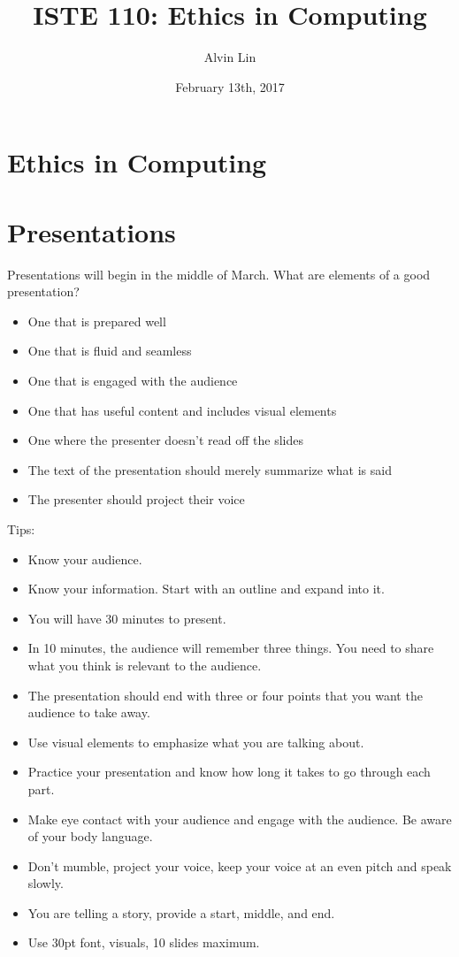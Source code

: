 \documentclass[letterpaper, 12pt]{article}
\title{ISTE 110: Ethics in Computing}
\author{Alvin Lin}
\date{February 13th, 2017}
\begin{document}
\maketitle

\section*{Ethics in Computing}

\section*{Presentations}
Presentations will begin in the middle of March.
What are elements of a good presentation?
\begin{itemize}
  \item One that is prepared well
  \item One that is fluid and seamless
  \item One that is engaged with the audience
  \item One that has useful content and includes visual elements
  \item One where the presenter doesn't read off the slides
  \item The text of the presentation should merely summarize what is said
  \item The presenter should project their voice
\end{itemize}
Tips:
\begin{itemize}
  \item Know your audience.
  \item Know your information. Start with an outline and expand into it.
  \item You will have 30 minutes to present.
  \item In 10 minutes, the audience will remember three things. You need to
    share what you think is relevant to the audience.
  \item The presentation should end with three or four points that you want
    the audience to take away.
  \item Use visual elements to emphasize what you are talking about.
  \item Practice your presentation and know how long it takes to go through
    each part.
  \item Make eye contact with your audience and engage with the audience. Be
    aware of your body language.
  \item Don't mumble, project your voice, keep your voice at an even pitch and
    speak slowly.
  \item You are telling a story, provide a start, middle, and end.
  \item Use 30pt font, visuals, 10 slides maximum.
\end{itemize}
\end{document}
